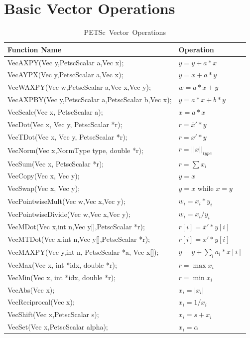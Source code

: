 \section{Basic Vector Operations}  
\label{sec_vecbasic}
\begin{table}[tb]
\begin{center}
\begin{tabular}{ll}
{\bf Function Name} & {\bf Operation} \\
\hline
VecAXPY(Vec y,PetscScalar a,Vec x); & $ y = y + a*x$ \\
VecAYPX(Vec y,PetscScalar a,Vec x); & $ y = x + a*y$ \\
VecWAXPY(Vec w,PetscScalar a,Vec x,Vec y); & $ w = a*x + y$ \\
VecAXPBY(Vec y,PetscScalar a,PetscScalar b,Vec x); & $ y = a*x + b*y$ \\
VecScale(Vec x, PetscScalar a); & $ x = a*x $ \\
VecDot(Vec x, Vec y, PetscScalar *r); & $ r = \bar{x}'*y$ \\
VecTDot(Vec x, Vec y, PetscScalar *r); & $ r = x'*y$ \\
VecNorm(Vec x,NormType type,  double *r); & $ r = ||x||_{type}$ \\
VecSum(Vec x,   PetscScalar *r); & $ r = \sum x_{i}$ \\
VecCopy(Vec x, Vec y); & $ y = x $ \\
VecSwap(Vec x, Vec y); & $ y = x $ while $ x = y$ \\
VecPointwiseMult(Vec w,Vec x,Vec y); & $ w_{i} = x_{i}*y_{i} $ \\
VecPointwiseDivide(Vec w,Vec x,Vec y); & $ w_{i} = x_{i}/y_{i} $ \\
VecMDot(Vec x,int n,Vec y[],PetscScalar *r); & $ r[i] = \bar{x}'*y[i]$ \\
VecMTDot(Vec x,int n,Vec y[],PetscScalar *r); & $ r[i] = x'*y[i]$ \\
VecMAXPY(Vec y,int n, PetscScalar *a, Vec x[]); \hspace{1cm} & $ y = y + \sum_i a_{i}*x[i] $ \\
VecMax(Vec x,  int *idx, double *r); & $ r = \max x_{i}$ \\
VecMin(Vec x,  int *idx, double *r); & $ r = \min x_{i}$ \\
VecAbs(Vec x); & $ x_i = |x_{i}|$ \\
VecReciprocal(Vec x); & $ x_i = 1/x_{i}$ \\
VecShift(Vec x,PetscScalar s); & $ x_i = s + x_{i}$ \\
VecSet(Vec x,PetscScalar alpha); & $ x_i = \alpha$ \\
\hline 
\end{tabular}
\end{center}
\caption{\hbox{PETSc Vector Operations}}
\label{fig_vectorops}
\end{table}

